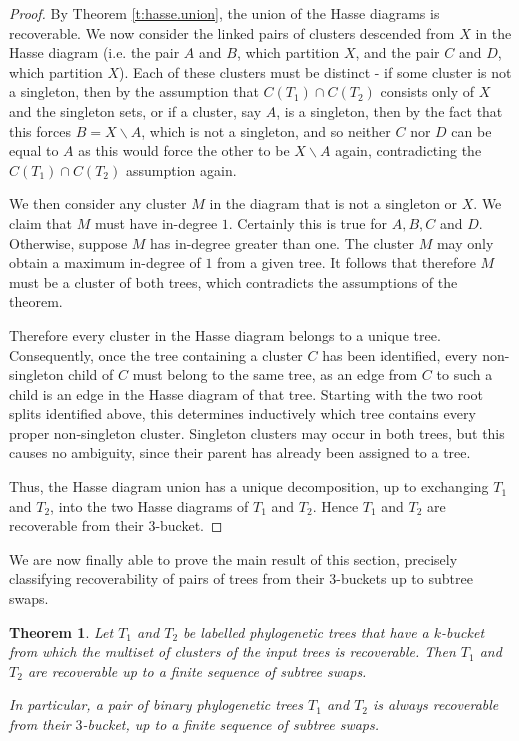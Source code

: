 \documentclass[12pt]{article}
\newtheorem{Theorem}{Theorem}[section]
\theoremstyle{definition}
\begin{document}
\begin{proof}
    By Theorem \ref{t:hasse.union}, the union of the Hasse diagrams is recoverable. We now consider the linked pairs of clusters descended from $X$ in the Hasse diagram (i.e. the pair $A$ and $B$, which partition $X$, and the pair $C$ and $D$, which partition $X$). Each of these clusters must be distinct - if some cluster is not a singleton, then by the assumption that $C(T_1) \cap C(T_2)$ consists only of $X$ and the singleton sets, or if a cluster, say $A$, is a singleton, then by the fact that this forces $B=X \backslash A$, which is not a singleton, and so neither $C$ nor $D$ can be equal to $A$ as this would force the other to be $X \backslash A$ again, contradicting the $C(T_1) \cap C(T_2)$ assumption again. 

    We then consider any cluster $M$ in the diagram that is not a singleton or $X$. We claim that $M$ must have in-degree $1$. Certainly this is true for $A,B,C$ and $D$. Otherwise, suppose $M$ has in-degree greater than one. The cluster $M$ may only obtain a maximum in-degree of $1$ from a given tree. It follows that therefore $M$ must be a cluster of both trees, which contradicts the assumptions of the theorem. 
    
    Therefore every cluster in the Hasse diagram belongs to a unique tree. Consequently, once the tree containing a cluster $C$ has been
    identified, every non-singleton child of $C$ must belong to the same tree, as an edge from $C$ to such a child is an edge in the Hasse diagram of that tree. Starting with the two root splits identified above, this determines inductively which tree contains every proper non-singleton cluster. Singleton clusters may occur in both trees, but this causes no ambiguity, since their parent has already been assigned to a tree.

    Thus, the Hasse diagram union has a unique decomposition, up to exchanging $T_1$ and $T_2$, into the two Hasse diagrams of $T_1$ and $T_2$. Hence $T_1$ and $T_2$ are recoverable from their $3$-bucket.
\end{proof}

We are now finally able to prove the main result of this section, precisely classifying recoverability of pairs of trees from their $3$-buckets up to subtree swaps.

\begin{Theorem}\label{t:full_subtree_swap}
    Let $T_1$ and $T_2$ be labelled phylogenetic trees that have a $k$-bucket from which the multiset of clusters of the input trees is recoverable. Then $T_1$ and $T_2$ are recoverable up to a finite sequence of subtree swaps.

    In particular, a pair of binary phylogenetic trees $T_1$ and $T_2$ is always recoverable from their $3$-bucket, up to a finite sequence of subtree swaps.
\end{Theorem}
\end{document}
